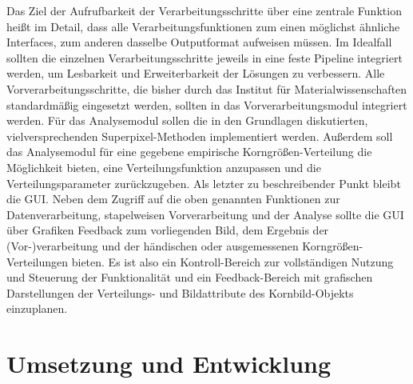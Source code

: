 \documentclass[
  12pt,
  openany]{book}
\begin{document}
Das Ziel der Aufrufbarkeit der Verarbeitungsschritte über eine zentrale Funktion heißt im Detail, dass alle Verarbeitungsfunktionen zum einen möglichst ähnliche Interfaces, zum anderen dasselbe Outputformat aufweisen müssen. Im Idealfall sollten die einzelnen Verarbeitungsschritte jeweils in eine feste Pipeline integriert werden, um Lesbarkeit und Erweiterbarkeit der Lösungen zu verbessern.\newline
Alle Vorverarbeitungsschritte, die bisher durch das Institut für Materialwissenschaften standardmäßig eingesetzt werden, sollten in das Vorverarbeitungsmodul integriert werden. Für das Analysemodul sollen die in den Grundlagen diskutierten, vielversprechenden Superpixel-Methoden implementiert werden. Außerdem soll das Analysemodul für eine gegebene empirische Korngrößen-Verteilung die Möglichkeit bieten, eine Verteilungsfunktion anzupassen und die Verteilungsparameter zurückzugeben.\newline
Als letzter zu beschreibender Punkt bleibt die GUI. Neben dem Zugriff auf die oben genannten Funktionen zur Datenverarbeitung, stapelweisen Vorverarbeitung und der Analyse sollte die GUI über Grafiken Feedback zum vorliegenden Bild, dem Ergebnis der (Vor-)verarbeitung und der händischen oder ausgemessenen Korngrößen-Verteilungen bieten. Es ist also ein Kontroll-Bereich zur vollständigen Nutzung und Steuerung der Funktionalität und ein Feedback-Bereich mit grafischen Darstellungen der Verteilungs- und Bildattribute des Kornbild-Objekts einzuplanen.

\hypertarget{umsetzung-und-entwicklung}{%
\chapter{Umsetzung und Entwicklung}\label{umsetzung-und-entwicklung}}
\end{document}
